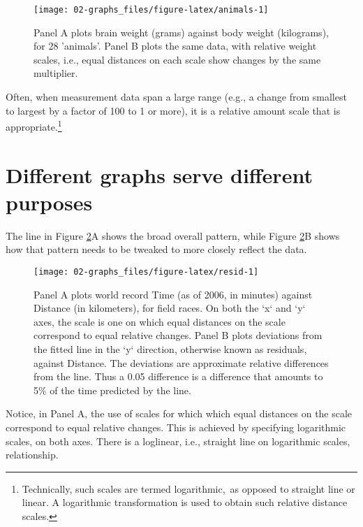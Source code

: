 \documentclass[
  10ptls,
  b5paper]{book}
\begin{document}
\begin{figure}[H]

{\centering \texttt{[image: 02-graphs\_files/figure-latex/animals-1]} 

}

\caption{Panel A plots brain weight (grams) against body weight 
(kilograms), for 28 'animals'.  Panel B plots the same data, 
with relative weight scales, i.e., equal distances on each scale 
show changes by the same multiplier.}\label{fig:animals}
\end{figure}

Often, when measurement data span a large range (e.g., a change from smallest to largest by a factor of 100 to 1 or more), it is a relative amount scale that is appropriate.\footnote{Technically, such scales are termed logarithmic,~as opposed to straight line or linear. A logarithmic transformation is used to obtain such relative distance scales.}

\section{Different graphs serve different purposes}\label{track}

The line in Figure \ref{fig:resid}A shows the broad overall pattern, while Figure \ref{fig:resid}B shows how that pattern needs to be tweaked to more closely reflect the data.

\begin{figure}[H]

{\centering \texttt{[image: 02-graphs\_files/figure-latex/resid-1]} 

}

\caption{Panel A plots world record Time (as of 2006, in minutes)
against Distance (in kilometers), for field races.  On both the
`x` and `y` axes, the scale is one on which equal distances on 
the scale correspond to equal relative changes.  Panel B plots
deviations from the fitted line in the `y` direction, otherwise
known as residuals, against Distance. The deviations are
approximate relative differences from the line.  Thus a 0.05
difference is a difference that amounts to 5\% of the time
predicted by the line.}\label{fig:resid}
\end{figure}

Notice, in Panel A, the use of scales for which which equal distances on the scale correspond to equal relative changes. This is achieved by specifying logarithmic scales, on both axes. There is a loglinear, i.e., straight line on logarithmic scales, relationship.
\end{document}
